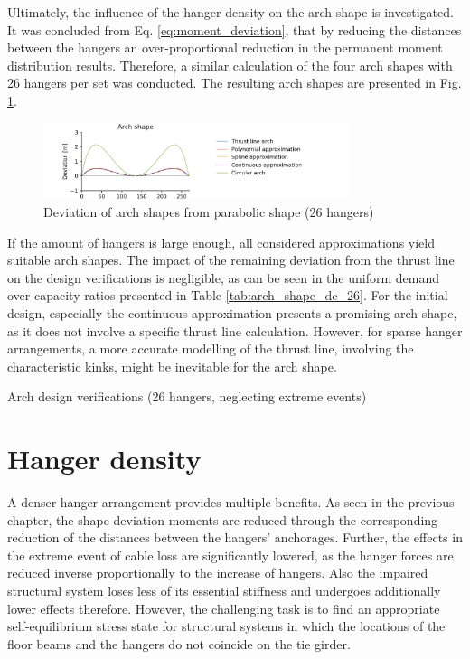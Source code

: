 Ultimately, the influence of the hanger density on the arch shape is investigated. It was concluded from Eq. \eqref{eq:moment_deviation}, that by reducing the distances between the hangers an over-proportional reduction in the permanent moment distribution results. Therefore, a similar calculation of the four arch shapes with 26 hangers per set was conducted. The resulting arch shapes are presented in Fig. \ref{fig:arch_shapes_26}.

\begin{figure}[H]
    \centering
    \includegraphics[trim={0 0 2cm 0},clip, width=0.8\textwidth]{calculations/arch shape/arch_shapes_26.png}
    \caption{Deviation of arch shapes from parabolic shape (26 hangers)}
    \label{fig:arch_shapes_26}
\end{figure}

If the amount of hangers is large enough, all considered approximations yield suitable arch shapes. The impact of the remaining deviation from the thrust line on the design verifications is negligible, as can be seen in the uniform demand over capacity ratios presented in Table \ref{tab:arch_shape_dc_26}. For the initial design, especially the continuous approximation presents a promising arch shape, as it does not involve a specific thrust line calculation. However, for sparse hanger arrangements, a more accurate modelling of the thrust line, involving the characteristic kinks, might be inevitable for the arch shape.

\begin{table}[H]
    \centering
    
    \caption{Arch design verifications (26 hangers, neglecting extreme events)}
    \label{tab:arch_shape_dc_26}
\end{table}


\newpage
\section{Hanger density}
A denser hanger arrangement provides multiple benefits. As seen in the previous chapter, the shape deviation moments are reduced through the corresponding reduction of the distances between the hangers' anchorages. Further, the effects in the extreme event of cable loss are significantly lowered, as the hanger forces are reduced inverse proportionally to the increase of hangers. Also the impaired structural system loses less of its essential stiffness and undergoes additionally lower effects therefore. However, the challenging task is to find an appropriate self-equilibrium stress state for structural systems in which the locations of the floor beams and the hangers do not coincide on the tie girder. \medskip

